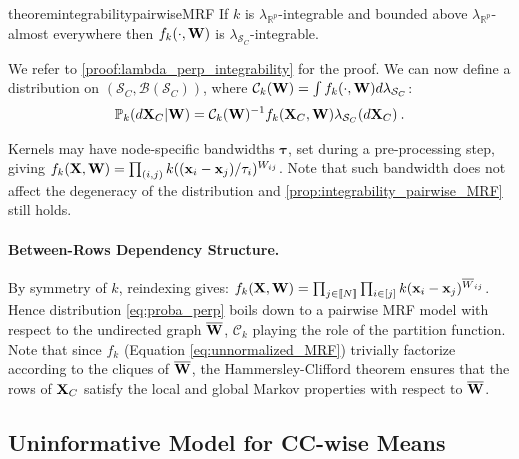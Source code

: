 \begin{restatable}{theorem}{integrabilitypairwiseMRF}
\label{prop:integrability_pairwise_MRF}
If $k$ is $\lambda_{\mathbb{R}^p}$-integrable and bounded above $\lambda_{\mathbb{R}^p}$-almost everywhere then $f_{k}(\cdot, {\mathbf{W}})$ is $\lambda_{\mathcal{S}_{C}}$-integrable.
\end{restatable}

We refer to \cref{proof:lambda_perp_integrability} for the proof.
We can now define a distribution on $(\mathcal{S}_{C}, \mathcal{B}(\mathcal{S}_{C}))$, where $\mathcal{C}_{k}({\mathbf{W}}) = \int f_{k}(\cdot, {\mathbf{W}}) d\lambda_{\mathcal{S}_{C}}$:
\begin{align}\label{eq:proba_perp}
\mathbb{P}_{k}(d\mathbf{X}_{C} | {\mathbf{W}}) = \mathcal{C}_{k}({\mathbf{W}})^{-1} f_{k}(\mathbf{X}_{C}, {\mathbf{W}}) \lambda_{\mathcal{S}_{C}}(d\mathbf{X}_{C}) \: .
\end{align}

\begin{remark}
Kernels may have node-specific bandwidths $\bm{\tau}$, set during a pre-processing step, giving $f_{k}(\mathbf{X},{\mathbf{W}}) = \prod_{(i,j)} k((\mathbf{x}_{i} - \mathbf{x}_{j})/\tau_{i})^{W_{ij}}$. Note that such bandwidth does not affect the degeneracy of the distribution and \cref{prop:integrability_pairwise_MRF} still holds.
\end{remark}


\paragraph{Between-Rows Dependency Structure.} By symmetry of $k$, reindexing gives: $f_{k}(\mathbf{X}, {\mathbf{W}}) = \prod_{j \in {[\![N]\!]}} \prod_{i \in [j]} k(\mathbf{x}_{i} - \mathbf{x}_{j})^{\overline{W}_{ij}}$. Hence distribution \eqref{eq:proba_perp} boils down to a pairwise MRF model \citep{clifford1990markov} with respect to the undirected graph $\overline{{\mathbf{W}}}$, $\mathcal{C}_{k}$ playing the role of the partition function. Note that since $f_k$ (Equation \ref{eq:unnormalized_MRF}) trivially factorize according to the cliques of $\overline{{\mathbf{W}}}$, the Hammersley-Clifford theorem ensures that the rows of $\mathbf{X}_{C}$ satisfy the local and global Markov properties with respect to $\overline{{\mathbf{W}}}$. 

\subsection{Uninformative Model for CC-wise Means}

